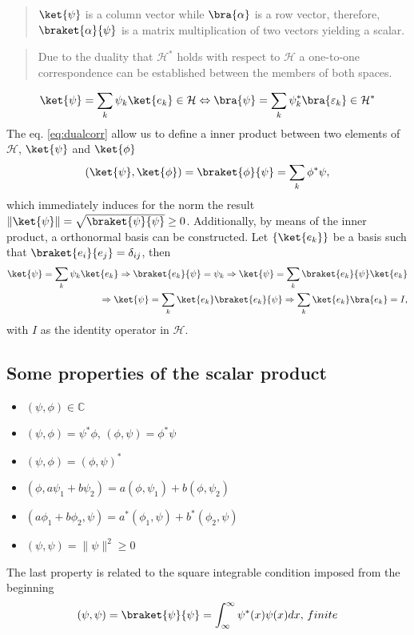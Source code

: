 \documentclass{article}
\begin{document}
\begin{quote}
  $\ket{\psi}$ is a column vector while $\bra{\alpha}$ is a row vector, therefore, $\braket{\alpha}{\psi}$ is a matrix multiplication of two vectors yielding a scalar.
\end{quote}
\begin{quotation}
  Due to the duality that $\mathcal{H}^*$ holds with respect to $\mathcal{H}$ a one-to-one correspondence can be established between the members of both spaces.
\end{quotation}
\begin{align}\label{eq:dualcorr}
  \ket{\psi} = \sum_k \psi_k\ket{e_k}\in \mathcal{H} \Leftrightarrow \bra{\psi} = \sum_k \psi_k ^*\bra{\varepsilon_k}\in \mathcal{H}^*
\end{align}
The eq. \ref{eq:dualcorr} allow us to define a inner product between two elements of $\mathcal{H}$, $\ket{\psi}$ and $\ket{\phi}$
\begin{align}
  (\ket{\psi},\ket{\phi}) = \braket{\phi}{\psi}=\sum_k \phi^*\psi,
\end{align}
which immediately induces for the norm the result $\| \ket{\psi}\| = \sqrt{\braket{\psi}{\psi}}\geq 0$. Additionally, by means of the inner product, a orthonormal basis can be constructed.
Let $\{\ket{e_k}\}$ be a basis such that $\braket{e_i}{e_j}=\delta_{ij}$, then
\begin{align}
  \ket{\psi} = \sum_k \psi_k \ket{e_k} \Rightarrow \braket{e_k}{\psi}=\psi_k \Rightarrow \ket{\psi} = \sum_k \braket{e_k}{\psi} \ket{e_k}\\
  \Rightarrow \ket{\psi} = \sum_k \ket{e_k}\braket{e_k}{\psi} \Rightarrow \sum_k \ket{e_k}\bra{e_k} = I,
\end{align}
with $I$ as the identity operator in $\mathcal{H}$.

\subsection{Some properties of the scalar product}
\begin{itemize}
  \item $(\psi,\phi) \in \mathbb{C}$
  \item $(\psi,\phi) = \psi^*\phi$, $(\phi,\psi)=\phi^*\psi$
  \item $(\psi,\phi) = (\phi,\psi)^*$
  \item $(\phi, a\psi_1+b\psi_2) = a(\phi,\psi_1)+b(\phi,\psi_2)$
  \item $(a\phi_1+b\phi_2,\psi) = a^*(\phi_1,\psi)+b^*(\phi_2,\psi)$
  \item $(\psi,\psi)=\|\psi\|^2\geq0$
\end{itemize}
The last property is related to the square integrable condition imposed from the beginning
\begin{align}
  (\psi,\psi) = \braket{\psi}{\psi}=\int_\infty ^\infty \psi^*(x)\psi(x)dx,\, finite
\end{align}
\end{document}
